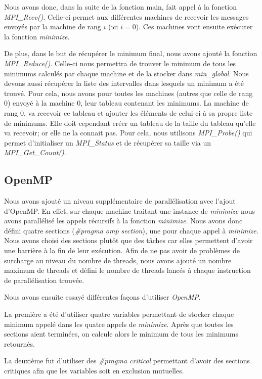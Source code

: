 \documentclass[a4paper,10pt]{article}
\begin{document}
Nous avons donc, dans la suite de la fonction main, fait appel à la fonction \emph{MPI\_Recv()}. Celle-ci permet aux différentes machines de recevoir les messages envoyés par la machine de rang $i$ (ici $i=0$). Ces machines vont ensuite exécuter la fonction \emph{minimize}. 

De plus, dans le but de récupérer le minimum final, nous avons ajouté la fonction \emph{MPI\_Reduce()}. Celle-ci nous permettra de trouver le minimum de tous les minimums calculés par chaque machine et de la stocker dans \emph{min\_global}.
Nous devons aussi récupérer la liste des intervalles dans lesquels un minimum a été trouvé. Pour cela, nous avons pour toutes les machines (autres que celle de rang 0) envoyé à la machine 0, leur tableau contenant les minimums. La machine de rang 0, va recevoir ce tableau et ajouter les éléments de celui-ci à sa propre liste de minimums. Elle doit cependant créer un tableau de la taille du tableau qu'elle va recevoir; or elle ne la connait pas. Pour cela, nous utilisons \emph{MPI\_Probe()} qui permet d'initialiser un \emph{MPI\_Status} et de récupérer sa taille via un \emph{MPI\_Get\_Count()}.

\subsection{OpenMP}
Nous avons ajouté un niveau supplémentaire de parallélisation avec l'ajout d'OpenMP. En effet, sur chaque machine traitant une instance de \emph{minimize} nous avons parallélisé les appels récursifs à la fonction \emph{minimize}. 
Nous avons donc défini quatre sections (\emph{\#pragma omp section}), une pour chaque appel à \emph{minimize}. Nous avons choisi des sections plutôt que des tâches car elles permettent d'avoir une barrière à la fin de leur exécution.
Afin de ne pas avoir de problèmes de surcharge au niveau du nombre de threads, nous avons ajouté un nombre maximum de threads et défini le nombre de threads lancés à chaque instruction de parallélisation trouvée.

Nous avons ensuite essayé différentes façons d'utiliser \emph{OpenMP}.

La première a été d'utiliser quatre variables permettant de stocker chaque minimum appelé dans les quatre appels de \emph{minimize}. Après que toutes les sections aient terminées, on calcule alors le minimum de tous les minimums retournés.

La deuxième fut d'utiliser des \emph{\#pragma critical} permettant d'avoir des sections critiques afin que les variables soit en exclusion mutuelles.
\end{document}
